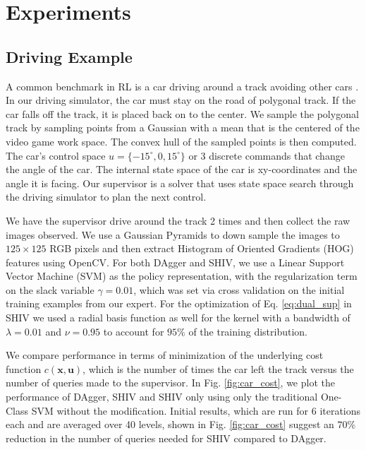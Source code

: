 \documentclass[10pt, conference]{ieeeconf}      %
\newcommand{\bu}{\mathbf{u}}
\newcommand{\bx}{\mathbf{x}}
\begin{document}
\section{Experiments}
\subsection{Driving Example}
A common benchmark in RL is a car driving around a track avoiding other cars \cite{argall2009survey}. In our driving simulator, the car must stay on the road of polygonal track. If the car falls off the track, it is placed back on to the center. We sample the polygonal track by sampling points from a Gaussian with a mean that is the centered of the video game work space. The convex hull of the sampled points is then computed. The car's control space $u = \lbrace -15^\circ, 0, 15^\circ \rbrace$ or 3 discrete commands that change the angle of the car. The internal state space of the car is xy-coordinates and the angle it is facing. Our supervisor is a solver that uses state space search through the driving simulator to plan the next control.

We have the supervisor drive around the track 2 times and then collect the raw images observed. We use a Gaussian Pyramids to down sample the images to $125 \times 125$ RGB pixels and then extract Histogram of Oriented Gradients (HOG) features using OpenCV. For both DAgger and SHIV, we use a Linear Support Vector Machine (SVM) as the policy representation, with the regularization term on the slack variable $\gamma=0.01$, which was set via cross validation on the initial training examples from our expert. For the optimization of Eq. \ref{eq:dual_sup} in SHIV we used a radial basis function as well for the kernel with a bandwidth of $\lambda=0.01$ and $\nu = 0.95$ to account for $95\%$ of the training distribution. 

We compare performance in terms of minimization of the underlying cost function $c(\bx,\bu)$, which is the  number of times the car left the track versus the number of queries made to the supervisor. In Fig. \ref{fig:car_cost}, we plot the performance of DAgger, SHIV and SHIV only using only the traditional One-Class SVM without the modification.  Initial results, which are run for 6 iterations each and are averaged over 40 levels, shown in Fig. \ref{fig:car_cost} suggest an $70\%$ reduction in the number of queries needed for SHIV compared to DAgger. 
\end{document}
